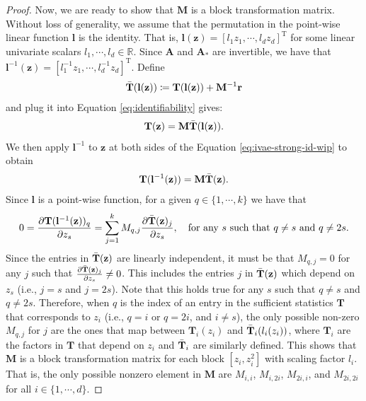 \documentclass{article} %
\theoremstyle{plain}
\theoremstyle{definition}
\theoremstyle{remark}
\begin{document}
\begin{proof}
    Now, we are ready to show that $\mathbf{M}$ is a block transformation matrix. Without loss of generality, we assume that the permutation in the point-wise linear function $\mathbf{l}$ is the identity. That is, $\mathbf{l}(\mathbf{z})=[l_1 z_1,\cdots,l_d z_d]^{\text{T}}$ for some linear univariate scalars $l_1,\cdots,l_d\in\mathbb{R}$. Since $\mathbf{A}$ and $\mathbf{A}_{*}$ are invertible, we have that $\mathbf{l}^{-1}(\mathbf{z})=[l_1^{-1} z_1,\cdots,l_d^{-1} z_d]^{\text{T}}$. Define
    \begin{align}
        \Bar{\mathbf{T}}(\mathbf{l}(\mathbf{z}))\coloneqq\mathbf{T}(\mathbf{l}(\mathbf{z}))+\mathbf{M}^{-1}\mathbf{r}
    \end{align}
    and plug it into Equation \eqref{eq:identifiability} gives:
    \begin{align}
        \mathbf{T}(\mathbf{z})=\mathbf{M}\Bar{\mathbf{T}}(\mathbf{l}(\mathbf{z})).\label{eq:ivae-strong-id-wip}
    \end{align}
    We then apply $\mathbf{l}^{-1}$ to $\mathbf{z}$ at both sides of the Equation \eqref{eq:ivae-strong-id-wip} to obtain
    \begin{align}
        \mathbf{T}(\mathbf{l}^{-1}(\mathbf{z}))=\mathbf{M}\Bar{\mathbf{T}}(\mathbf{z}).
    \end{align}
    Since $\mathbf{l}$ is a point-wise function, for a given $q\in\{1,\cdots,k\}$ we have that 
    \begin{align}\label{eq:proof_perm}
        0 = \frac{\partial \mathbf{T}(\mathbf{l}^{-1}(\mathbf{z}))_q}{\partial z_s}=\sum_{j=1}^k M_{q,j}\frac{\partial \Bar{\mathbf{T}}(\mathbf{z})_j}{\partial z_s},\quad\text{for any $s$ such that $q\not=s$ and $q\not=2s$}.
    \end{align}
    Since the entries in $\Bar{\mathbf{T}}(\mathbf{z})$ are linearly independent, it must be that $M_{q,j}=0$ for any $j$ such that $\frac{\partial \Bar{\mathbf{T}}(\mathbf{z})_j}{\partial z_s}\not=0$. This includes the entries $j$ in $\Bar{\mathbf{T}}(\mathbf{z})$ which depend on $z_s$ (i.e., $j=s$ and $j=2s$). Note that this holds true for any $s$ such that $q\not=s$ and $q\not=2s$. Therefore, when $q$ is the index of an entry in the sufficient statistics $\mathbf{T}$ that corresponds to $z_i$ (i.e., $q=i$ or $q=2i$, and $i\not=s$), the only possible non-zero $M_{q,j}$ for $j$ are the ones that map between $\mathbf{T}_i(z_i)$ and $\Bar{\mathbf{T}}_i(l_i(z_i))$, where $\mathbf{T}_i$ are the factors in $\mathbf{T}$ that depend on $z_i$ and $\Bar{\mathbf{T}}_i$ are similarly defined. This shows that $\mathbf{M}$ is a block transformation matrix for each block $[z_i,z_i^2]$ with scaling factor $l_i$. That is, the only possible nonzero element in $\mathbf{M}$ are $M_{i,i}$, $M_{i,2i}$, $M_{2i,i}$, and $M_{2i,2i}$ for all $i\in\{1,\cdots,d\}$.
    

\end{proof}
\end{document}
